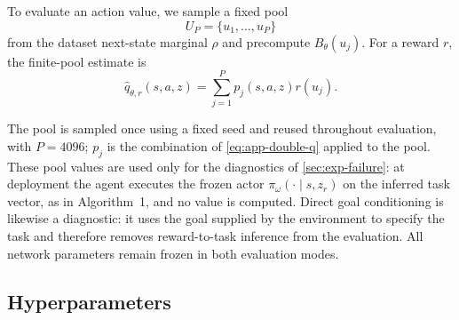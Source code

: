 To evaluate an action value, we sample a fixed pool
\begin{equation}
    U_P = \{u_1,\ldots,u_P\}
\end{equation}
from the dataset next-state marginal $\rho$ and precompute $B_\theta(u_j)$.
For a reward $r$, the finite-pool estimate is
\begin{equation}
    \hat q_{\theta,r}(s,a,z) = \sum_{j=1}^{P} p_j(s,a,z) r(u_j). \label{eq:app-zs-readout}
\end{equation}

The pool is sampled once using a fixed seed and reused throughout evaluation, with $P=4096$; $p_j$ is the combination of \cref{eq:app-double-q} applied to the pool.
These pool values are used only for the diagnostics of \cref{sec:exp-failure}: at deployment the agent executes the frozen actor $\pi_\omega(\cdot\mid s,z_r)$ on the inferred task vector, as in Algorithm~1, and no value is computed.
Direct goal conditioning is likewise a diagnostic: it uses the goal supplied by the environment to specify the task and therefore removes reward-to-task inference from the evaluation.
All network parameters remain frozen in both evaluation modes.

\subsection{Hyperparameters}
\label{app:hparams}

